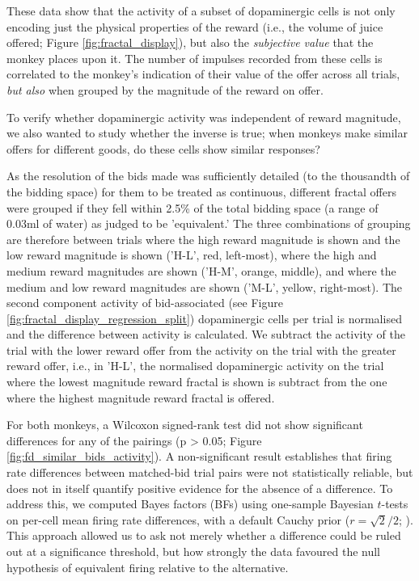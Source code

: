 These data show that the activity of a subset of dopaminergic cells is not only encoding just the physical properties of the reward (i.e., the volume of juice offered; Figure \ref{fig:fractal_display}), but also the \textit{subjective value} that the monkey places upon it. The number of impulses recorded from these cells is correlated to the monkey's indication of their value of the offer across all trials, \textit{but also} when grouped by the magnitude of the reward on offer.

To verify whether dopaminergic activity was independent of reward magnitude, we also wanted to study whether the inverse is true; when monkeys make similar offers for different goods, do these cells show similar responses?

As the resolution of the bids made was sufficiently detailed (to the thousandth of the bidding space) for them to be treated as continuous, different fractal offers were grouped if they fell within 2.5\% of the total bidding space (a range of 0.03ml of water) as judged to be 'equivalent.' The three combinations of grouping are therefore between trials where the high reward magnitude is shown and the low reward magnitude is shown ('H-L', red, left-most), where the high and medium reward magnitudes are shown ('H-M', orange, middle), and where the medium and low reward magnitudes are shown ('M-L', yellow, right-most). The second component activity of bid-associated (see Figure \ref{fig:fractal_display_regression_split}) dopaminergic cells per trial is normalised and the difference between activity is calculated. We subtract the activity of the trial with the lower reward offer from the activity on the trial with the greater reward offer, i.e., in 'H-L', the normalised dopaminergic activity on the trial where the lowest magnitude reward fractal is shown is subtract from the one where the highest magnitude reward fractal is offered.

For both monkeys, a Wilcoxon signed-rank test did not show significant differences for any of the pairings (p > 0.05; Figure \ref{fig:fd_similar_bids_activity}). A non-significant result establishes that firing rate differences between matched-bid trial pairs were not statistically reliable, but does not in itself quantify positive evidence for the absence of a difference. To address this, we computed Bayes factors (BFs) using one-sample Bayesian $t$-tests on per-cell mean firing rate differences, with a default Cauchy prior ($r = \sqrt{2}/2$; \citealt{rouder2009bayesian}). This approach allowed us to ask not merely whether a difference could be ruled out at a significance threshold, but how strongly the data favoured the null hypothesis of equivalent firing relative to the alternative.

